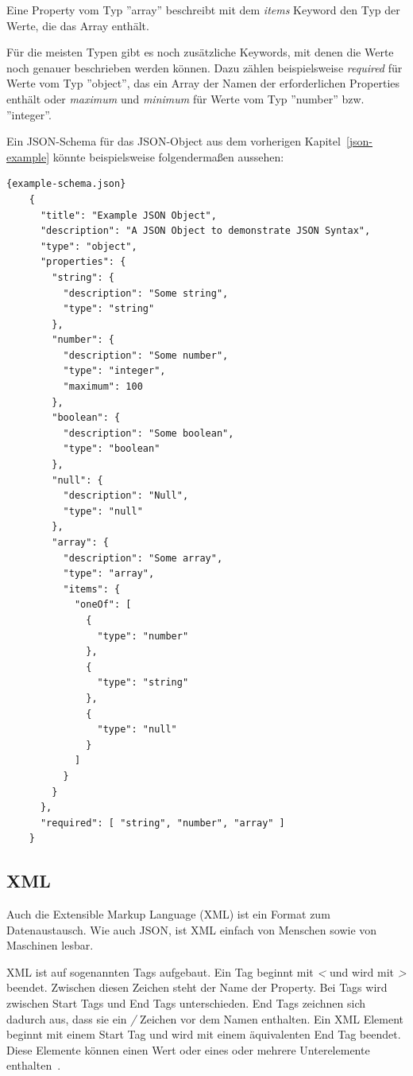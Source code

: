  Eine Property vom Typ ''array'' beschreibt mit dem \textit{items} Keyword den Typ der Werte, die das Array enthält.

 Für die meisten Typen gibt es noch zusätzliche Keywords, mit denen die Werte noch genauer beschrieben werden können.
 Dazu zählen beispielsweise \textit{required} für Werte vom Typ ''object'', das ein Array der Namen der erforderlichen
 Properties enthält oder \textit{maximum} und \textit{minimum} für Werte vom Typ ''number'' bzw. ''integer''.

 Ein JSON-Schema für das JSON-Object aus dem vorherigen Kapitel~\ref{json-example} könnte beispielsweise
 folgendermaßen aussehen:

 \begin{lstlisting}[label={lst:example-schema.json}]{example-schema.json}
    {
      "title": "Example JSON Object",
      "description": "A JSON Object to demonstrate JSON Syntax",
      "type": "object",
      "properties": {
        "string": {
          "description": "Some string",
          "type": "string"
        },
        "number": {
          "description": "Some number",
          "type": "integer",
          "maximum": 100
        },
        "boolean": {
          "description": "Some boolean",
          "type": "boolean"
        },
        "null": {
          "description": "Null",
          "type": "null"
        },
        "array": {
          "description": "Some array",
          "type": "array",
          "items": {
            "oneOf": [
              {
                "type": "number"
              },
              {
                "type": "string"
              },
              {
                "type": "null"
              }
            ]
          }
        }
      },
      "required": [ "string", "number", "array" ]
    }
 \end{lstlisting}

\subsection{XML}
Auch die Extensible Markup Language (XML) ist ein Format zum Datenaustausch.
Wie auch JSON, ist XML einfach von Menschen sowie von Maschinen lesbar.

XML ist auf sogenannten Tags aufgebaut.
Ein Tag beginnt mit \textit{<} und wird mit \textit{>} beendet.
Zwischen diesen Zeichen steht der Name der Property.
Bei Tags wird zwischen Start Tags und End Tags unterschieden.
End Tags zeichnen sich dadurch aus, dass sie ein \textit{/} Zeichen vor dem Namen enthalten.
Ein XML Element beginnt mit einem Start Tag und wird mit einem äquivalenten End Tag beendet.
Diese Elemente können einen Wert oder eines oder mehrere Unterelemente enthalten~\cite{xml}.

